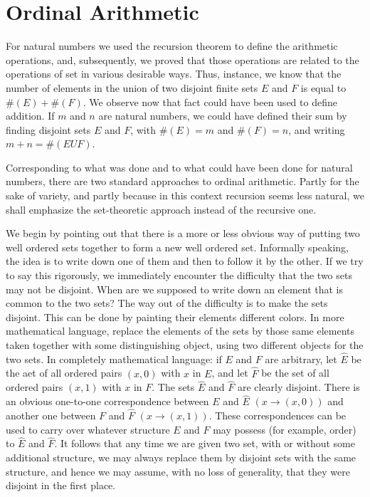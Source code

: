 
\chapter{Ordinal Arithmetic} 

For natural numbers we used the recursion theorem to define the arithmetic operations, and, subsequently, we proved that those operations are related to the operations of set in various desirable ways. Thus, instance, we know that the number of elements in the union of two disjoint finite sets $E$ and $F$ is equal to $\# (E) + \# (F)$. We observe now that fact could have been used to define addition. If $m$ and $n$ are natural numbers, we could have defined their sum by finding disjoint sets $E$ and $F$, with $\# (E) = m$ and $\# (F) = n$, and writing $m+ n = \# (E U F)$.

Corresponding to what was done and to what could have been done for natural numbers, there are two standard approaches to ordinal arithmetic. Partly for the sake of variety, and partly because in this context recursion seems less natural, we shall emphasize the set-theoretic approach instead of the recursive one. 

We begin by pointing out that there is a more or less obvious way of putting two well ordered sets together to form a new well  ordered set. Informally speaking, the idea is to write down one of them and then to follow it by the other. If we try to say this rigorously, we immediately encounter the difficulty that the two sets may not be disjoint. When are we supposed to write down an element that is common to the two sets? The way out of the difficulty is to make the sets disjoint. This can be done by painting their elements different colors. In more mathematical language, replace the elements of the sets by those same elements taken together with some distinguishing object, using two different objects for the two sets. In completely mathematical language: if $E$ and $F$ are arbitrary, let $\hat{E}$ be the aet of all ordered pairs $(x, 0)$ with $x$ in $E$, and let $\hat{F}$ be the set of all ordered pairs $(x,1)$ with $x$ in $F$. The sets $\hat{E}$ and $\hat{F}$ are clearly disjoint. There is an obvious one-to-one correspondence between $E$ and $\hat{E}$ $(x \rightarrow (x,0))$ and another one between $F$ and $\hat{F}$ $(x \rightarrow (x,1))$. These correspondences can be used to carry over whatever structure $E$ and $F$ may possess (for example, order) to $\hat{E}$ and $\hat{F}$. It follows that any time we are given two set, with or without some additional structure, we may always replace them by disjoint sets with the same structure, and hence we may assume, with no loss of generality, that they were disjoint in the first place. 


